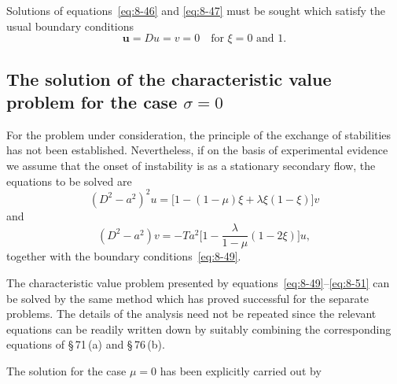 Solutions of equations~\eqref{eq:8-46} and \eqref{eq:8-47} must be sought which satisfy the usual boundary conditions
\begin{equation}
\label{eq:8-49}
\mathbf{u} = Du = v = 0 \quad \text{for } \xi = 0 \text{ and } 1.
\end{equation}

\subsection{The solution of the characteristic value problem for the case $\sigma = 0$}
\label{sec:77b}

For the problem under consideration, the principle of the exchange of stabilities has not been established. Nevertheless, if on the basis of experimental evidence we assume that the onset of instability is as a stationary secondary flow, the equations to be solved are
\begin{equation}
\label{eq:8-50}
(D^2 - a^2)^2 u = \bigl[1-(1-\mu)\xi + \lambda\xi(1-\xi)\bigr]v
\end{equation}
and
\begin{equation}
\label{eq:8-51}
(D^2 - a^2)v = -Ta^2\biggl[1 - \frac{\lambda}{1-\mu}(1-2\xi)\biggr]u,
\end{equation}
together with the boundary conditions~\eqref{eq:8-49}.

The characteristic value problem presented by equations~\eqref{eq:8-49}--\eqref{eq:8-51} can be solved by the same method which has proved successful for the separate problems. The details of the analysis need not be repeated since the relevant equations can be readily written down by suitably combining the corresponding equations of \S\,71\,(a) and \S\,76\,(b).

The solution for the case $\mu = 0$ has been explicitly carried out by

